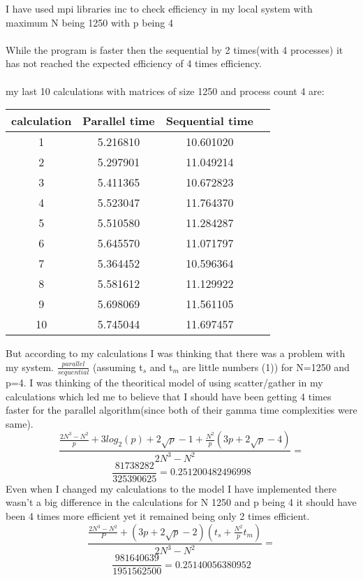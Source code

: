 I have used mpi libraries inc to check efficiency in my local system with maximum N being 1250 with p being 4\\
\\
While the program is faster then the sequential by 2 times(with 4 processes) it has not reached the expected efficiency of 4 times efficiency.\\
\\
my last 10 calculations with matrices of size 1250 and process count 4 are:
\begin{center}
	\begin{tabular}{ |c|c|c|c| } 
		\hline
		calculation & Parallel time & Sequential time \\ \hline
		1 & 5.216810 & 10.601020 \\ 
		2 & 5.297901 & 11.049214 \\ 
		3 & 5.411365 & 10.672823 \\ 
		4 & 5.523047 & 11.764370 \\ 
		5 & 5.510580 & 11.284287 \\ 
		6 & 5.645570 & 11.071797 \\ 
		7 & 5.364452 & 10.596364 \\ 
		8 & 5.581612 & 11.129922 \\ 
		9 & 5.698069 & 11.561105 \\ 
		10 & 5.745044 & 11.697457 \\ 
		\hline
	\end{tabular}
\end{center}
But according to my calculations I was thinking that there was a problem with my system. $\frac{parallel}{sequential}$ (assuming t$_s$ and t$_m$ are little numbers (1)) for N=1250 and p=4. I was thinking of the theoritical model of using scatter/gather in my calculations which led me to believe that I should have been getting 4 times faster for the parallel algorithm(since both of their gamma time complexities were same).
\[
\frac{\frac{2N^3-N^2}{p}+3log_2(p)+2\sqrt{p}-1+\frac{N^2}{p}(3p+2\sqrt{p}-4)}{2N^3-N^2}=
\]
\[\frac{81738282}{325390625}=0.251200482496998\]
Even when I changed my calculations to the model I have implemented there wasn't a big difference in the calculations for N 1250 and p being 4 it should have been 4 times more efficient yet it remained being only 2 times efficient. 
\[
\frac{\frac{2N^3-N^2}{P}+(3p+2\sqrt{p}-2)(t_s+\frac{N^2}{p}t_m)}{2N^3-N^2}=
\]
\[\frac{981640639}{1951562500}=0.25140056380952\]